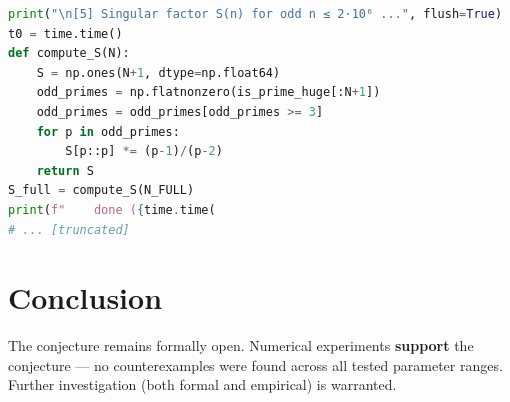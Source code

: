 \documentclass[11pt]{article}
\begin{document}
\begin{lstlisting}[language=Python]
print("\n[5] Singular factor S(n) for odd n ≤ 2·10⁶ ...", flush=True)
t0 = time.time()
def compute_S(N):
    S = np.ones(N+1, dtype=np.float64)
    odd_primes = np.flatnonzero(is_prime_huge[:N+1])
    odd_primes = odd_primes[odd_primes >= 3]
    for p in odd_primes:
        S[p::p] *= (p-1)/(p-2)
    return S
S_full = compute_S(N_FULL)
print(f"    done ({time.time(
# ... [truncated]
\end{lstlisting}


\section{Conclusion}

The conjecture remains formally open. Numerical experiments \textbf{support} the conjecture --- no counterexamples were found across all tested parameter ranges.
Further investigation (both formal and empirical) is warranted.
\end{document}
